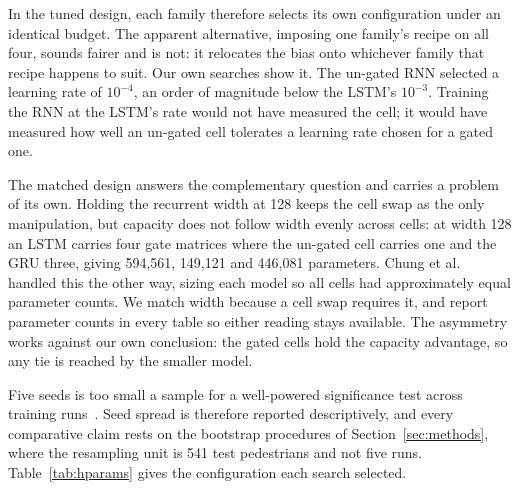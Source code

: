 \documentclass[mti,article,submit,moreauthors]{Definitions/mdpi}
\begin{document}
In the tuned design, each family therefore selects its own configuration under an identical budget. The apparent alternative, imposing one family's recipe on all four, sounds fairer and is not: it relocates the bias onto whichever family that recipe happens to suit. Our own searches show it. The un-gated RNN selected a learning rate of $10^{-4}$, an order of magnitude below the LSTM's $10^{-3}$. Training the RNN at the LSTM's rate would not have measured the cell; it would have measured how well an un-gated cell tolerates a learning rate chosen for a gated one.

The matched design answers the complementary question and carries a problem of its own. Holding the recurrent width at 128 keeps the cell swap as the only manipulation, but capacity does not follow width evenly across cells: at width 128 an LSTM carries four gate matrices where the un-gated cell carries one and the GRU three, giving 594,561, 149,121 and 446,081 parameters. Chung et al.~\citep{chung2014gru} handled this the other way, sizing each model so all cells had approximately equal parameter counts. We match width because a cell swap requires it, and report parameter counts in every table so either reading stays available. The asymmetry works against our own conclusion: the gated cells hold the capacity advantage, so any tie is reached by the smaller model.

Five seeds is too small a sample for a well-powered significance test across training runs~\citep{bouthillier2021variance,reimers2017reporting}. Seed spread is therefore reported descriptively, and every comparative claim rests on the bootstrap procedures of Section~\ref{sec:methods}, where the resampling unit is 541 test pedestrians and not five runs. Table~\ref{tab:hparams} gives the configuration each search selected.
\end{document}
